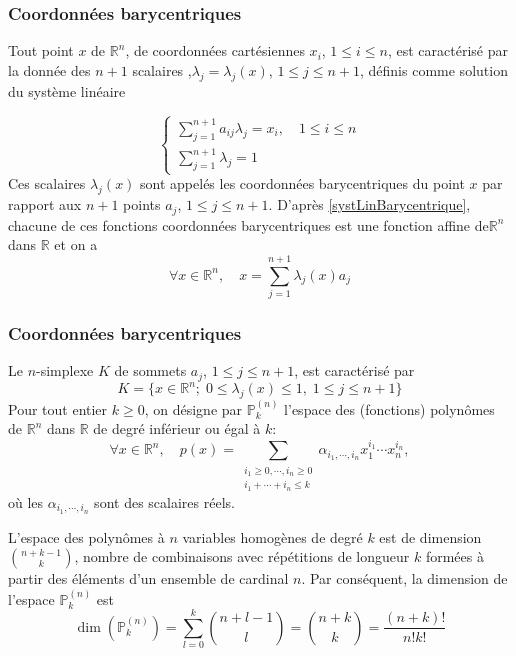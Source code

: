 \documentclass{beamer}
\begin{document}
\begin{frame}
\frametitle{Coordonnées barycentriques}
  Tout point $x$ de $\mathbb{R}^n$, de coordonnées cartésiennes $x_i$, $1\leq i\leq n$, est caractérisé par la donnée des $n+ 1$ scalaires ,$\lambda_j=\lambda_j(x)$, $1\leq j \leq n+1$, définis comme solution du système linéaire

\begin{equation}
\left\{\begin{array}{l}
\displaystyle \sum_{j=1}^{n+1}a_{ij}\lambda_j =x_i, \quad 1\leq i\leq n\\
\displaystyle \sum_{j=1}^{n+1}\lambda_j =1
\end{array}\right.
\label{systLinBarycentrique}
\end{equation}
Ces scalaires $\lambda_j(x)$ sont  appelés les coordonnées barycentriques du point $x$ par rapport aux $n+ 1$ points 
$a_j$, $1\leq j\leq n+1$. D'après \eqref{systLinBarycentrique}, chacune de ces fonctions coordonnées barycentriques est une fonction affine de$\mathbb{R}^n$ dans $\mathbb{R}$ et on a
\begin{equation}
\forall x\in\mathbb{R}^n,\quad x=\sum_{j=1}^{n+1}\lambda_j(x) a_{j}
\end{equation}
\end{frame}



\begin{frame}
\frametitle{Coordonnées barycentriques}

Le $n$-simplexe $K$ de sommets $a_j$, $1\leq j\leq n+1$, est caractérisé par
\begin{equation}
K=\{x\in \mathbb{R}^n;\;0\leq \lambda_j(x) \leq 1,\; 1\leq j\leq n+1\}
\end{equation}
Pour tout entier   $k\geq 0$,  on désigne par $\mathbb{P}_k^{(n)}$ l'espace des (fonctions) polynômes de $\mathbb{R}^n$ dans $\mathbb{R}$ de degré inférieur ou égal à $k$:
\begin{equation}
\forall x\in\mathbb{R}^n,\quad p(x)=\sum_{\begin{array}{c} i_1\geq 0,\cdots ,i_n\geq 0\\i_1+\cdots +i_n\leq k \end{array}}\alpha_{i_1,\cdots,i_n}x_1^{i_1}\cdots x_n^{i_n},
\end{equation}
où les $\alpha_{i_1,\cdots,i_n}$  sont des scalaires réels.

  L'espace des polynômes à $n$ variables homogènes de degré $k$ est de dimension 
$\binom {n+k-1}k$, nombre de combinaisons avec répétitions de longueur $k$ formées à partir des éléments d'un ensemble de cardinal $n$. Par conséquent, la dimension de l'espace $\mathbb{P}_k^{(n)}$ est
\begin{equation}
\dim(\mathbb{P}_k^{(n)})=\sum_{l=0}^k \binom {n+l-1}l=\binom {n+k}k=\frac{(n+k)!}{n!k!}
\end{equation}
\end{frame}
\end{document}
